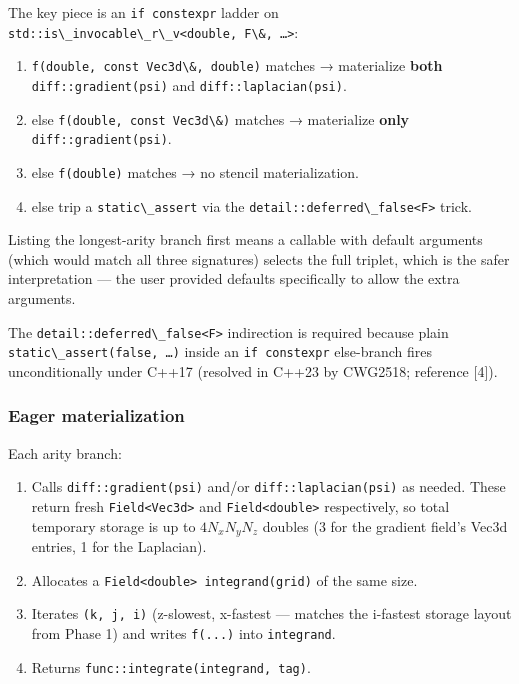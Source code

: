 The key piece is an \passthrough{\lstinline!if constexpr!} ladder on
\passthrough{\lstinline!std::is\_invocable\_r\_v<double, F\&, …>!}:

\begin{enumerate}
\def\labelenumi{\arabic{enumi}.}
\tightlist
\item
  \passthrough{\lstinline!f(double, const Vec3d\&, double)!} matches →
  materialize \textbf{both}
  \passthrough{\lstinline!diff::gradient(psi)!} and
  \passthrough{\lstinline!diff::laplacian(psi)!}.
\item
  else \passthrough{\lstinline!f(double, const Vec3d\&)!} matches →
  materialize \textbf{only}
  \passthrough{\lstinline!diff::gradient(psi)!}.
\item
  else \passthrough{\lstinline!f(double)!} matches → no stencil
  materialization.
\item
  else trip a \passthrough{\lstinline!static\_assert!} via the
  \passthrough{\lstinline!detail::deferred\_false<F>!} trick.
\end{enumerate}

Listing the longest-arity branch first means a callable with default
arguments (which would match all three signatures) selects the full
triplet, which is the safer interpretation --- the user provided
defaults specifically to allow the extra arguments.

The \passthrough{\lstinline!detail::deferred\_false<F>!} indirection is
required because plain
\passthrough{\lstinline!static\_assert(false, …)!} inside an
\passthrough{\lstinline!if constexpr!} else-branch fires unconditionally
under C++17 (resolved in C++23 by CWG2518; reference {[}4{]}).

\subsubsection{Eager materialization}\label{eager-materialization}

Each arity branch:

\begin{enumerate}
\def\labelenumi{\arabic{enumi}.}
\tightlist
\item
  Calls \passthrough{\lstinline!diff::gradient(psi)!} and/or
  \passthrough{\lstinline!diff::laplacian(psi)!} as needed. These return
  fresh \passthrough{\lstinline!Field<Vec3d>!} and
  \passthrough{\lstinline!Field<double>!} respectively, so total
  temporary storage is up to \(4 N_x N_y N_z\) doubles (3 for the
  gradient field's Vec3d entries, 1 for the Laplacian).
\item
  Allocates a \passthrough{\lstinline!Field<double> integrand(grid)!} of
  the same size.
\item
  Iterates \passthrough{\lstinline!(k, j, i)!} (z-slowest, x-fastest ---
  matches the i-fastest storage layout from Phase 1) and writes
  \passthrough{\lstinline!f(...)!} into
  \passthrough{\lstinline!integrand!}.
\item
  Returns \passthrough{\lstinline!func::integrate(integrand, tag)!}.
\end{enumerate}

